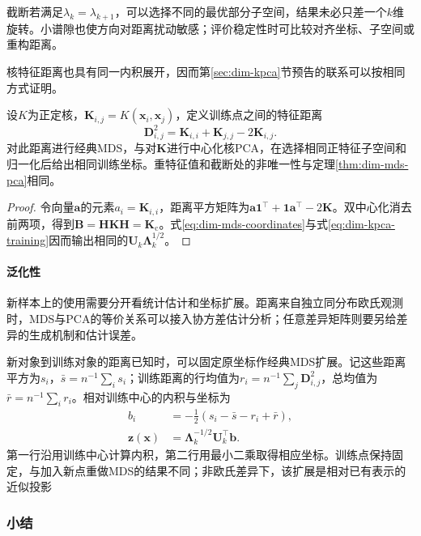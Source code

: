 截断若满足$\lambda_k=\lambda_{k+1}$，可以选择不同的最优部分子空间，结果未必只差一个$k$维旋转。小谱隙也使方向对距离扰动敏感；评价稳定性时可比较对齐坐标、子空间或重构距离。

核特征距离也具有同一内积展开，因而第\ref{sec:dim-kpca}节预告的联系可以按相同方式证明。

\begin{theorem}[核诱导距离下的等价关系]
  \label{thm:dim-kpca-mds}
  设$K$为正定核，$\bm{K}_{i,j}=K(\bm{x}_i,\bm{x}_j)$，定义训练点之间的特征距离
  \[
    \bm{D}_{i,j}^2
    =\bm{K}_{i,i}+\bm{K}_{j,j}-2\bm{K}_{i,j}.
  \]
  对此距离进行经典MDS，与对$\bm{K}$进行中心化核PCA，在选择相同正特征子空间和归一化后给出相同训练坐标。重特征值和截断处的非唯一性与定理\ref{thm:dim-mds-pca}相同。
\end{theorem}
\begin{proof}
  令向量$\bm{a}$的元素$a_i=\bm{K}_{i,i}$，距离平方矩阵为$\bm{a}\bm{1}^{\top}+\bm{1}\bm{a}^{\top}-2\bm{K}$。双中心化消去前两项，得到$\bm{B}=\bm{H}\bm{K}\bm{H}=\bm{K}_{\mathrm{c}}$。式\eqref{eq:dim-mds-coordinates}与式\eqref{eq:dim-kpca-training}因而输出相同的$\bm{U}_k\bm{\Lambda}_k^{1/2}$。
\end{proof}

\paragraph{泛化性}

新样本上的使用需要分开看统计估计和坐标扩展。距离来自独立同分布欧氏观测时，MDS与PCA的等价关系可以接入协方差估计分析；任意差异矩阵则要另给差异的生成机制和估计误差。

新对象到训练对象的距离已知时，可以固定原坐标作经典MDS扩展。记这些距离平方为$s_i$，$\bar s=n^{-1}\sum_i s_i$；训练距离的行均值为$r_i=n^{-1}\sum_j\bm{D}_{i,j}^2$，总均值为$\bar r=n^{-1}\sum_i r_i$。相对训练中心的内积与坐标为
\begin{equation}
  \label{eq:dim-mds-extension}
  \begin{aligned}
    b_i&=-\frac12(s_i-\bar s-r_i+\bar r),\\
    \bm{z}(\bm{x})
      &=\bm{\Lambda}_k^{-1/2}\bm{U}_k^{\top}\bm{b}.
  \end{aligned}
\end{equation}
第一行沿用训练中心计算内积，第二行用最小二乘取得相应坐标。训练点保持固定，与加入新点重做MDS的结果不同；非欧氏差异下，该扩展是相对已有表示的近似投影

\subsubsection{小结}

